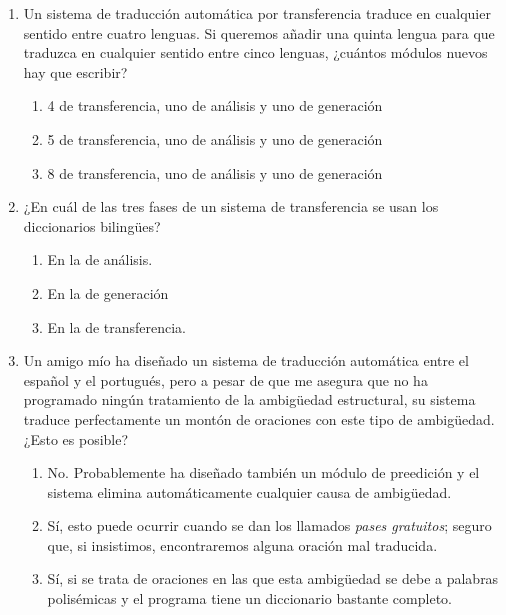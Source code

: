 \begin{enumerate}
\item Un sistema de traducción automática por transferencia traduce en cualquier sentido entre cuatro lenguas. Si queremos añadir una quinta lengua para que traduzca en cualquier sentido entre cinco lenguas, ¿cuántos módulos nuevos hay que escribir? \begin{enumerate} \item 4 de transferencia, uno de análisis y uno de generación \item 5 de transferencia, uno de análisis y uno de generación \item 8 de transferencia, uno de análisis y uno de generación \end{enumerate} 

\item ¿En cuál de las tres fases de un sistema de transferencia se usan los diccionarios bilingües? \begin{enumerate} \item En la de análisis. \item En la de generación \item En la de transferencia. \end{enumerate} 

\item Un amigo mío ha diseñado un sistema de traducción automática entre el español y el portugués, pero a pesar de que me asegura que no ha programado ningún tratamiento de la ambigüedad estructural, su sistema traduce perfectamente un montón de oraciones con este tipo de ambigüedad. ¿Esto es posible? \begin{enumerate} \item No. Probablemente ha diseñado también un módulo de preedición y el sistema elimina automáticamente cualquier causa de ambigüedad. \item Sí, esto puede ocurrir cuando se dan los llamados \emph{pases gratuitos}; seguro que, si insistimos, encontraremos alguna oración mal traducida. \item Sí, si se trata de oraciones en las que esta ambigüedad se debe a palabras polisémicas y el programa tiene un diccionario bastante completo. \end{enumerate} 


\end{enumerate}

